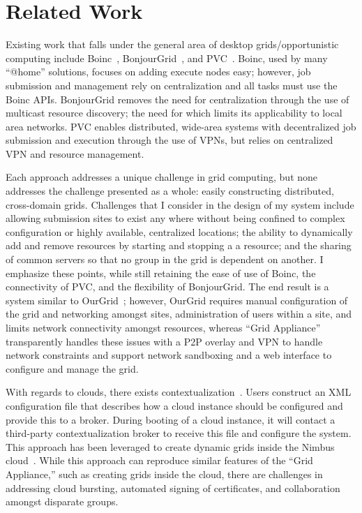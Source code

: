 \section{Related Work}
\label{related_work}

Existing work that falls under the general area of desktop grids/opportunistic
computing include Boinc~\cite{boinc}, BonjourGrid~\cite{bonjourgrid}, and
PVC~\cite{pvc}.  Boinc, used by many ``@home'' solutions, focuses on adding
execute nodes easy; however, job submission and management rely on
centralization and all tasks must use the Boinc APIs.  BonjourGrid removes the
need for centralization through the use of multicast resource discovery; the
need for which limits its applicability to local area networks.  PVC enables
distributed, wide-area systems with decentralized job submission and execution
through the use of VPNs, but relies on centralized VPN and resource management.

Each approach addresses a unique challenge in grid computing, but none
addresses the challenge presented as a whole: easily constructing distributed,
cross-domain grids.  Challenges that I consider in the design of my system
include allowing submission sites to exist any where without being confined to
complex configuration or highly available, centralized locations; the ability
to dynamically add and remove resources by starting and stopping a a resource;
and the sharing of common servers so that no group in the grid is dependent on
another.  I emphasize these points, while still retaining the ease of use of
Boinc, the connectivity of PVC, and the flexibility of BonjourGrid.  The end
result is a system similar to OurGrid~\cite{ourgrid}; however, OurGrid requires
manual configuration of the grid and networking amongst sites, administration
of users within a site, and limits network connectivity amongst resources,
whereas ``Grid Appliance'' transparently handles these issues with a P2P
overlay and VPN to handle network constraints and support network sandboxing
and a web interface to configure and manage the grid.

With regards to clouds, there exists contextualization~\cite{context}.  Users
construct an XML configuration file that describes how a cloud instance should
be configured and provide this to a broker.  During booting of a cloud
instance, it will contact a third-party contextualization broker to receive
this file and configure the system.  This approach has been leveraged to create
dynamic grids inside the Nimbus cloud~\cite{alien_grid}.  While this approach
can reproduce similar features of the ``Grid Appliance,'' such as creating
grids inside the cloud, there are challenges in addressing cloud bursting,
automated signing of certificates, and collaboration amongst disparate groups.
